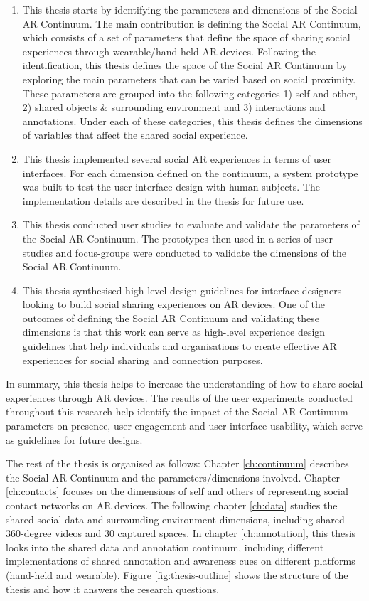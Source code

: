 \begin{enumerate}
    \item This thesis starts by identifying the parameters and dimensions of the Social AR Continuum. The main contribution is defining the Social AR Continuum, which consists of a set of parameters that define the space of sharing social experiences through wearable/hand-held AR devices. Following the identification, this thesis defines the space of the Social AR Continuum by exploring the main parameters that can be varied based on social proximity. These parameters are grouped into the following categories 1) self and other, 2) shared objects \& surrounding environment and 3) interactions and annotations. Under each of these categories, this thesis defines the dimensions of variables that affect the shared social experience.
    
    \item This thesis implemented several social AR experiences in terms of user interfaces. For each dimension defined on the continuum, a system prototype was built to test the user interface design with human subjects. The implementation details are described in the thesis for future use.
    
    \item This thesis conducted user studies to evaluate and validate the parameters of the Social AR Continuum. The prototypes then used in a series of user-studies and focus-groups were conducted to validate the dimensions of the Social AR Continuum.
    
    \item This thesis synthesised high-level design guidelines for interface designers looking to build social sharing experiences on AR devices. One of the outcomes of defining the Social AR Continuum and validating these dimensions is that this work can serve as high-level experience design guidelines that help individuals and organisations to create effective AR experiences for social sharing and connection purposes.
\end{enumerate}

In summary, this thesis helps to increase the understanding of how to share social experiences through AR devices. The results of the user experiments conducted throughout this research help identify the impact of the Social AR Continuum parameters on presence, user engagement and user interface usability, which serve as guidelines for future designs. 

The rest of the thesis is organised as follows: Chapter \ref{ch:continuum} describes the Social AR Continuum and the parameters/dimensions involved. 
Chapter \ref{ch:contacts} focuses on the dimensions of self and others of representing social contact networks on AR devices. 
The following chapter \ref{ch:data} studies the shared social data and surrounding environment dimensions, including shared 360-degree videos and 30 captured spaces. 
In chapter \ref{ch:annotation}, this thesis looks into the shared data and annotation continuum, including different implementations of shared annotation and awareness cues on different platforms (hand-held and wearable).
Figure \ref{fig:thesis-outline} shows the structure of the thesis and how it answers the research questions. 

